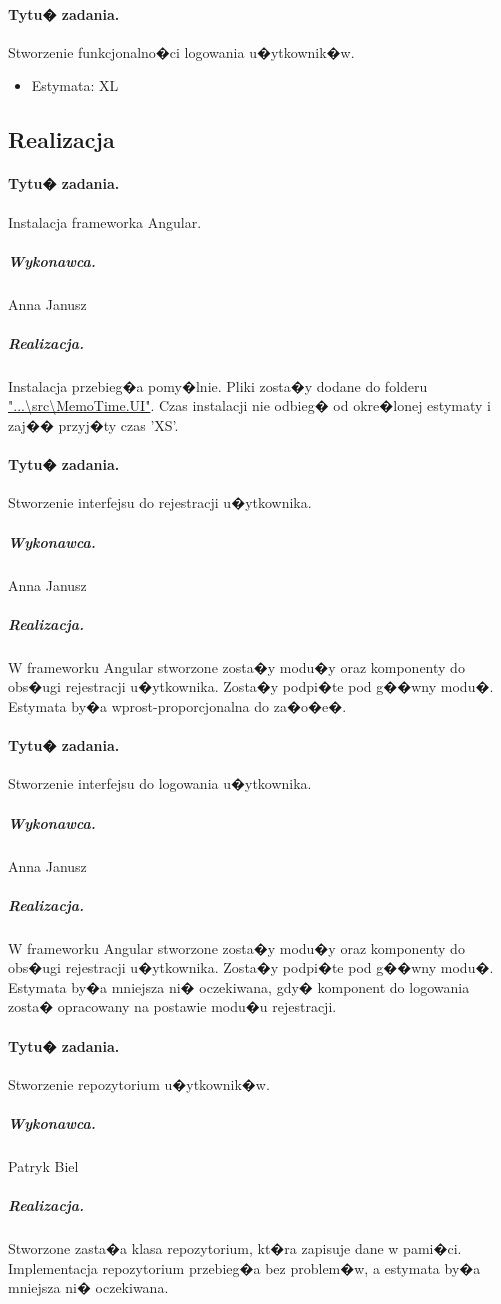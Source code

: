﻿\documentclass[a4paper]{article}
\begin{document}
\paragraph{Tytu� zadania.} Stworzenie funkcjonalno�ci logowania u�ytkownik�w.
\begin{itemize}
\item Estymata: XL
\end{itemize}


\subsection{Realizacja}

\paragraph{Tytu� zadania.} Instalacja frameworka Angular.
\subparagraph{Wykonawca.} Anna Janusz
\subparagraph{Realizacja.} Instalacja przebieg�a pomy�lnie. Pliki zosta�y dodane do folderu \url{"...\src\MemoTime.UI"}. Czas instalacji nie odbieg� od okre�lonej estymaty i zaj�� przyj�ty czas 'XS'.


\paragraph{Tytu� zadania.} Stworzenie interfejsu do rejestracji u�ytkownika.
\subparagraph{Wykonawca.} Anna Janusz
\subparagraph{Realizacja.} W frameworku Angular stworzone zosta�y modu�y oraz komponenty do obs�ugi rejestracji u�ytkownika. Zosta�y podpi�te pod g��wny modu�. Estymata by�a wprost-proporcjonalna do za�o�e�.


\paragraph{Tytu� zadania.} Stworzenie interfejsu do logowania u�ytkownika.
\subparagraph{Wykonawca.} Anna Janusz
\subparagraph{Realizacja.} W frameworku Angular stworzone zosta�y modu�y oraz komponenty do obs�ugi rejestracji u�ytkownika. Zosta�y podpi�te pod g��wny modu�. Estymata by�a mniejsza ni� oczekiwana, gdy� komponent do logowania zosta� opracowany na postawie modu�u rejestracji.


\paragraph{Tytu� zadania.} Stworzenie repozytorium u�ytkownik�w.
\subparagraph{Wykonawca.} Patryk Biel
\subparagraph{Realizacja.} Stworzone zasta�a klasa repozytorium, kt�ra zapisuje dane w pami�ci. Implementacja repozytorium przebieg�a bez problem�w, a estymata by�a mniejsza ni� oczekiwana.
\end{document}
